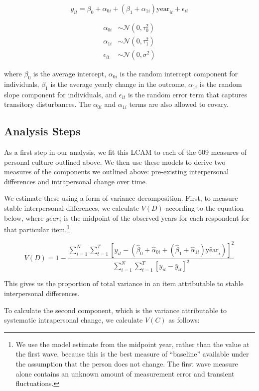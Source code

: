 \documentclass[
  12pt,
]{article}
\begin{document}
\[
y_{it} = \beta_0 + \alpha_{0i} + (\beta_1 + \alpha_{1i}) \text{year}_{it} + \epsilon_{it}
\]

\[
\begin{aligned}
\alpha_{0i} &\sim \mathcal{N}(0,\tau^2_{0}) \\
\alpha_{1i} &\sim \mathcal{N}(0,\tau^2_{1}) \\
\epsilon_{it} &\sim \mathcal{N}(0,\sigma^2)
\end{aligned}
\]

where \(\beta_0\) is the average intercept, \(\alpha_{0i}\) is the
random intercept component for individuals, \(\beta_1\) is the average
yearly change in the outcome, \(\alpha_{1i}\) is the random slope
component for individuals, and \(\epsilon_{it}\) is the random error
term that captures transitory disturbances. The \(\alpha_{0i}\) and
\(\alpha_{1i}\) terms are also allowed to covary.

\hypertarget{analysis-steps}{%
\subsection{Analysis Steps}\label{analysis-steps}}

As a first step in our analysis, we fit this LCAM to each of the 609
measures of personal culture outlined above. We then use these models to
derive two measures of the components we outlined above: pre-existing
interpersonal differences and intrapersonal change over time.

We estimate these using a form of variance decomposition. First, to
measure stable interpersonal differences, we calculate \(V(D)\)
according to the equation below, where \(\widetilde{year_i}\) is the
midpoint of the observed years for each respondent for that particular
item.\footnote{We use the model estimate from the midpoint year, rather
  than the value at the first wave, because this is the best measure of
  ``baseline'' available under the assumption that the person does not
  change. The first wave measure alone contains an unknown amount of
  measurement error and transient fluctuations.}

\[
V(D) = 1 - \frac{\sum_{i=1}^N \sum_{t=1}^T [y_{it} - (\hat{\beta}_0 + \hat{\alpha}_{0i} + (\hat{\beta}_1 + \hat{\alpha}_{1i}) \widetilde{\text{year}}_{i})]^2}{\sum_{i=1}^N \sum_{t=1}^T [y_{it} - \bar{y}_{it}]^2}
\]

This gives us the proportion of total variance in an item attributable
to stable interpersonal differences.

To calculate the second component, which is the variance attributable to
systematic intrapersonal change, we calculate \(V(C)\) as follows:
\end{document}

